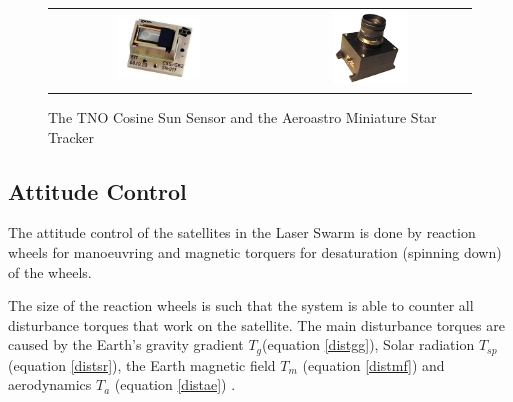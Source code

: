 \begin{figure} [h]
\centering
\begin{tabular}{c c}
\includegraphics[width = 0.4\textwidth]{chapters/img/CoSS.jpg} & \includegraphics[width = 0.4\textwidth]{chapters/img/MSTracker.png}
\end{tabular}
\caption[Sun sensor and star tracker]{The TNO Cosine Sun Sensor \cite{tnoweb} and the Aeroastro Miniature Star Tracker \cite{aeromst}}
\label{fig:sunstar}
\end{figure}

\subsection{Attitude Control}
\label{ss:emDDacs}
The attitude control of the satellites in the Laser Swarm is done by reaction wheels for manoeuvring and magnetic torquers for desaturation (spinning down) of the wheels. 

The size of the reaction wheels is such that the system is able to counter all disturbance torques that work on the satellite. The main disturbance torques are caused by the Earth's gravity gradient $T_g$(equation \ref{distgg}), Solar radiation $T_{sp}$ (equation \ref{distsr}), the Earth magnetic field $T_m$ (equation \ref{distmf}) and aerodynamics $T_a$ (equation \ref{distae}) \cite{larson}.

